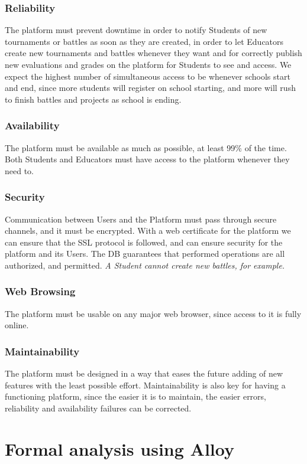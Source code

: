 \documentclass{article}
\begin{document}
{\subsubsection{Reliability}
The platform must prevent downtime in order to notify Students of new tournaments or battles as soon as they are created, in order to let
Educators create new tournaments and battles whenever they want and for correctly publish new evaluations and grades on the platform for
Students to see and access.
We expect the highest number of simultaneous access to be whenever schools start and end, since more students will register on school starting,
and more will rush to finish battles and projects as school is ending.
\subsubsection{Availability}
The platform must be available as much as possible, at least 99\% of the time.
Both Students and Educators must have access to the platform whenever they need to.
\subsubsection{Security}
Communication between Users and the Platform must pass through secure channels, and it must be encrypted.
With a web certificate for the platform we can ensure that the SSL protocol is followed, and can ensure security for the platform and its Users.
The DB guarantees that performed operations are all authorized, and permitted.
\textit{A Student cannot create new battles, for example.}
\subsubsection{Web Browsing}
The platform must be usable on any major web browser, since access to it is fully online.
\subsubsection{Maintainability}
The platform must be designed in a way that eases the future adding of new features with the least possible effort.
Maintainability is also key for having a functioning platform, since the easier it is to maintain, the easier errors, 
reliability and availability failures can be corrected.
\newpage
\pagestyle{FormalAnalysisAlloyStyle}

\section{Formal analysis using Alloy}

}
\end{document}
